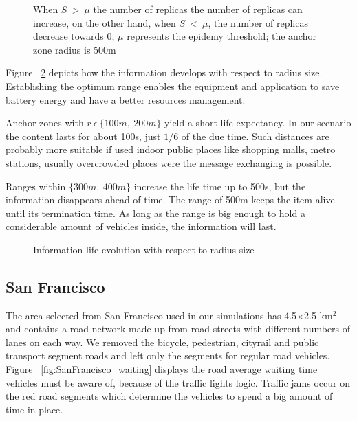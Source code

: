  \begin{figure}[h]
	\centering
	\def\svgwidth{\columnwidth}
	
	\caption{ When $S\ >\ \mu$ the number of replicas the number of replicas can
	increase, on the other hand, when $S\ <\ \mu$, the number of replicas decrease
	towards 0; $\mu$ represents the epidemy threshold; the anchor zone radius is
	500m}
 	\label{fig:Beijing_info_evolution_epidemy}
 \end{figure}
 
 Figure ~\ref{fig:Beijing_info_evolution_range} depicts how the information
 develops with respect to radius size. Establishing the optimum range enables
 the equipment and application to save battery energy and have a better
 resources management. 
 
 Anchor zones with $r\ \epsilon\ \{100m,\ 200m\}$ yield a short life expectancy.
 In our scenario the content lasts for about 100s, just $1/6$ of the due time.
 Such distances are probably more suitable if used indoor public places like
 shopping malls, metro stations, usually overcrowded places were the message
 exchanging is possible.
 
 Ranges within $\{300m,\ 400m\}$ increase the life time up to 500s, but the
 information disappears ahead of time. The range of 500m keeps the item alive
 until its termination time. As long as the range is big enough to hold a
 considerable amount of vehicles inside, the information will last.
 
 \begin{figure}[h]
	\centering
	\def\svgwidth{\columnwidth}
	
	\caption{Information life evolution with respect to radius size}
 	\label{fig:Beijing_info_evolution_range}
 \end{figure}
 
\subsection{San Francisco}

The area selected from San Francisco used in our simulations has 4.5$\times$2.5
km$^2$ and contains a road network made up from road streets with different
numbers of lanes on each way. We removed the bicycle, pedestrian, cityrail and
public transport segment roads and left only the segments for regular road
vehicles. Figure ~\ref{fig:SanFrancisco_waiting} displays the road average
waiting time vehicles must be aware of, because of the traffic lights logic.
Traffic jams occur on the red road segments which determine the vehicles to
spend a big amount of time in place.

